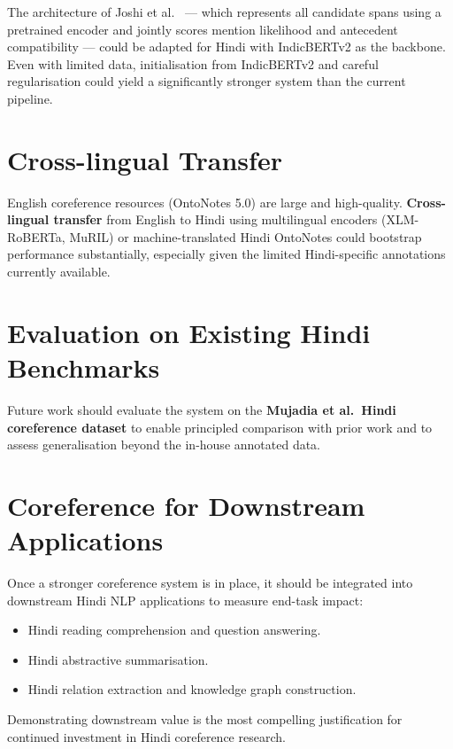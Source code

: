 \documentclass[12pt,a4paper]{report}
\begin{document}
The architecture of Joshi et al.\ \cite{joshi2019bert} --- which represents all candidate spans using a pretrained encoder and jointly scores mention likelihood and antecedent compatibility --- could be adapted for Hindi with IndicBERTv2 as the backbone. Even with limited data, initialisation from IndicBERTv2 and careful regularisation could yield a significantly stronger system than the current pipeline.

\section{Cross-lingual Transfer}

English coreference resources (OntoNotes 5.0) are large and high-quality. \textbf{Cross-lingual transfer} from English to Hindi using multilingual encoders (XLM-RoBERTa, MuRIL) or machine-translated Hindi OntoNotes could bootstrap performance substantially, especially given the limited Hindi-specific annotations currently available.

\section{Evaluation on Existing Hindi Benchmarks}

Future work should evaluate the system on the \textbf{Mujadia et al.\ Hindi coreference dataset} to enable principled comparison with prior work and to assess generalisation beyond the in-house annotated data.

\section{Coreference for Downstream Applications}

Once a stronger coreference system is in place, it should be integrated into downstream Hindi NLP applications to measure end-task impact:
\begin{itemize}
    \item Hindi reading comprehension and question answering.
    \item Hindi abstractive summarisation.
    \item Hindi relation extraction and knowledge graph construction.
\end{itemize}

Demonstrating downstream value is the most compelling justification for continued investment in Hindi coreference research.
\end{document}
